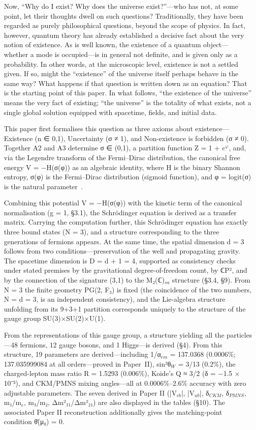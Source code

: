 \documentclass[12pt,a4paper]{article}
\begin{document}
Now, ``Why do I exist? Why does the universe exist?''---who has not, at some point, let their thoughts dwell on such questions? Traditionally, they have been regarded as purely philosophical questions, beyond the scope of physics. In fact, however, quantum theory has already established a decisive fact about the very notion of existence. As is well known, the existence of a quantum object---whether a mode is occupied---is in general not definite, and is given only as a probability. In other words, at the microscopic level, existence is not a settled given. If so, might the ``existence'' of the universe itself perhaps behave in the same way? What happens if that question is written down as an equation? That is the starting point of this paper. In what follows, ``the existence of the universe'' means the very fact of existing; ``the universe'' is the totality of what exists, not a single global solution equipped with spacetime, fields, and initial data.

This paper first formalises this question as three axioms about existence---Existence (n ∈ {0,1}), Uncertainty (σ ≠ 1), and Non-existence is forbidden (σ ≠ 0). Together A2 and A3 determine σ ∈ (0,1), a partition function Z = 1 + $e^\varphi$, and, via the Legendre transform of the Fermi–Dirac distribution, the canonical free energy V = −H(σ(φ)) as an algebraic identity, where H is the binary Shannon entropy, σ(φ) is the Fermi–Dirac distribution (sigmoid function), and φ = logit(σ) is the natural parameter~\cite{amari,ay}.

Combining this potential V = −H(σ(φ)) with the kinetic term of the canonical normalisation (g = 1, §3.1), the Schr\"odinger equation is derived as a transfer matrix. Carrying the computation further, this Schr\"odinger equation has exactly three bound states (N = 3), and a structure corresponding to the three generations of fermions appears. At the same time, the spatial dimension d = 3 follows from two conditions---preservation of the well and propagating gravity. The spacetime dimension is D = d + 1 = 4, supported as consistency checks under stated premises by the gravitational degree-of-freedom count, by ℂP², and by the connection of the signature (3,1) to the M₂(ℂ)$_{sa}$ structure (§3.4, §9). From N = 3 the finite geometry PG(2, F₃) is fixed (the coincidence of the two numbers, N = d = 3, is an independent consistency), and the Lie-algebra structure unfolding from its 9+3+1 partition corresponds uniquely to the structure of the gauge group SU(3)×SU(2)×U(1).

From the representations of this gauge group, a structure yielding all the particles---48 fermions, 12 gauge bosons, and 1 Higgs---is derived (§4). From this structure, 19 parameters are derived---including 1/α$_{em}$ = 137.0368 (0.0006\%; 137.035999084 at all orders---proved in Paper~II), sin²θ$_W$ = 3/13 (0.2\%), the charged-lepton mass ratio R = 1.5293 (0.006\%), Koide's Q ≈ 3/2 (δ = −1.5 × 10⁻⁵), and CKM/PMNS mixing angles---all at 0.0006\%–2.6\% accuracy with zero adjustable parameters. The seven derived in Paper II (|V$_{cb}$|, |V$_{ub}$|, δ$_{CKM}$, δ$_{PMNS}$, m₁/m$_e$, m₃/m₂, Δm²₃₁/Δm²₂₁) are also displayed in the tables (§10). The associated Paper II reconstruction additionally gives the matching-point condition θ̄(μ₀) = 0.
\end{document}
